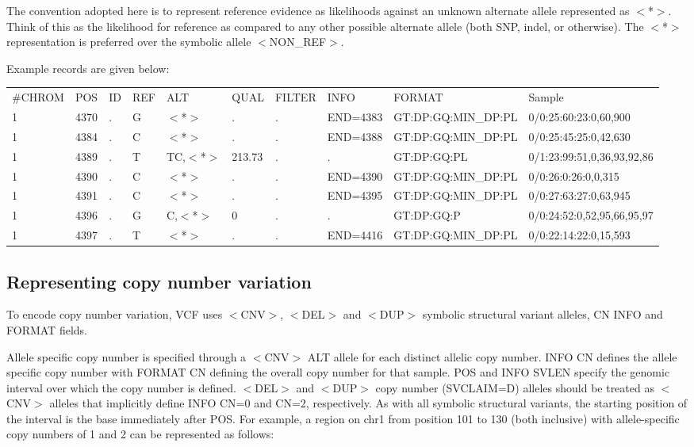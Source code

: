 \documentclass[8pt]{article}
\begin{document}
The convention adopted here is to represent reference evidence as likelihoods against an unknown alternate allele represented as $<$*$>$.
Think of this as the likelihood for reference as compared to any other possible alternate allele (both SNP, indel, or otherwise).
The $<$*$>$ representation is preferred over the symbolic allele $<$NON\_REF$>$.

Example records are given below:
\scriptsize
\begin{flushleft}
\begin{tabular}{ l l l l l l l l l l }
\#CHROM & POS & ID & REF & ALT & QUAL & FILTER & INFO & FORMAT & Sample \\
1 & 4370 & . & G & $<$*$>$ & . & . & END=4383 & GT:DP:GQ:MIN\_DP:PL & 0/0:25:60:23:0,60,900 \\
1 & 4384 & . & C & $<$*$>$ & . & . & END=4388 & GT:DP:GQ:MIN\_DP:PL & 0/0:25:45:25:0,42,630 \\
1 & 4389 & . & T & TC,$<$*$>$ & 213.73 & . & . & GT:DP:GQ:PL & 0/1:23:99:51,0,36,93,92,86 \\
1 & 4390 & . & C & $<$*$>$ & . & . & END=4390 & GT:DP:GQ:MIN\_DP:PL & 0/0:26:0:26:0,0,315 \\
1 & 4391 & . & C & $<$*$>$ & . & . & END=4395 & GT:DP:GQ:MIN\_DP:PL & 0/0:27:63:27:0,63,945 \\
1 & 4396 & . & G & C,$<$*$>$ & 0 & . & . & GT:DP:GQ:P & 0/0:24:52:0,52,95,66,95,97 \\
1 & 4397 & . & T & $<$*$>$ & . & . & END=4416 & GT:DP:GQ:MIN\_DP:PL & 0/0:22:14:22:0,15,593 \\
\end{tabular}
\end{flushleft}
\normalsize


\pagebreak
\subsection{Representing copy number variation}
\label{cnv}

To encode copy number variation, VCF uses $<$CNV$>$, $<$DEL$>$ and $<$DUP$>$ symbolic structural variant alleles, CN INFO and FORMAT fields.

Allele specific copy number is specified through a $<$CNV$>$ ALT allele for each distinct allelic copy number.
INFO CN defines the allele specific copy number with FORMAT CN defining the overall copy number for that sample.
POS and INFO SVLEN specify the genomic interval over which the copy number is defined.
$<$DEL$>$ and $<$DUP$>$ copy number (SVCLAIM=D) alleles should be treated as $<$CNV$>$ alleles that implicitly define INFO CN=0 and CN=2, respectively.
As with all symbolic structural variants, the starting position of the interval is the base immediately after POS.
For example, a region on chr1 from position 101 to 130 (both inclusive) with allele-specific copy numbers of 1 and 2 can be represented as follows:
\end{document}
